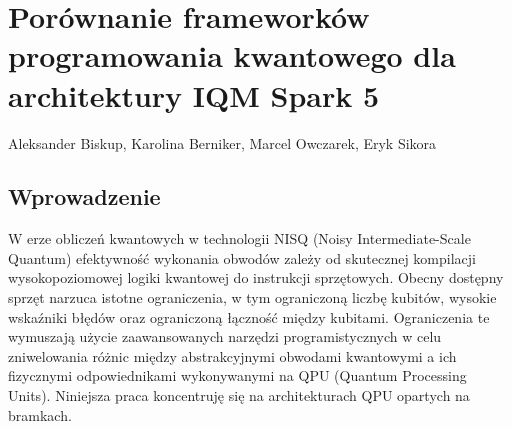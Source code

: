 \chapter[Porównanie frameworków \ldots]{Porównanie frameworków programowania kwantowego dla architektury IQM Spark 5}
\thispagestyle{empty}
\vspace{-8mm} {\large Aleksander Biskup, Karolina Berniker, Marcel Owczarek, Eryk Sikora} \vspace{8mm}




\section{Wprowadzenie}
\label{sec:introduction}
W erze obliczeń kwantowych w technologii NISQ (Noisy Intermediate-Scale Quantum) efektywność wykonania obwodów zależy od skutecznej kompilacji wysokopoziomowej logiki kwantowej do instrukcji sprzętowych. Obecny dostępny sprzęt narzuca istotne ograniczenia, w tym ograniczoną liczbę kubitów, wysokie wskaźniki błędów oraz ograniczoną łączność między kubitami. Ograniczenia te wymuszają użycie zaawansowanych narzędzi programistycznych w celu zniwelowania różnic między abstrakcyjnymi obwodami kwantowymi a ich fizycznymi odpowiednikami wykonywanymi na QPU (Quantum Processing Units). Niniejsza praca koncentruję się na architekturach QPU opartych na bramkach.

